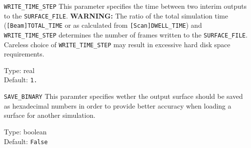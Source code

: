 \begin{keydescription}{\texttt{WRITE\_TIME\_STEP}}
This parameter specifies the time between two interim outputs to the
\texttt{SURFACE\_FILE}. 
\textbf{WARNING:} The ratio of the total simulation
time (\texttt{[Beam]TOTAL\_TIME} or as calculated from \texttt{[Scan]DWELL\_TIME})
and \texttt{WRITE\_TIME\_STEP} determines the number of frames written to the
\texttt{SURFACE\_FILE}. Careless choice of \texttt{WRITE\_TIME\_STEP} may result
in excessive hard disk space requirements.
\begin{keytab}
   Type:    \> real \\
   Default: \> \texttt{1.}
\end{keytab}
\end{keydescription}

\begin{keydescription}{\texttt{SAVE\_BINARY}}
This paramter specifies wether the output surface should be saved as hexadecimal numbers
in order to provide better accuracy when loading a surface for another simulation.
\begin{keytab}
   Type:    \> boolean \\
   Default: \> \texttt{False}
\end{keytab}
\end{keydescription}
